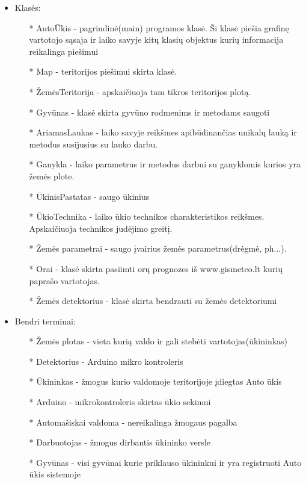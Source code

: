 \documentclass[oneside]{VUMIFPSkursinis}
\begin{document}
\begin{itemize}
	\item Klasės:
		\begin{itemize}
			\item[*] AutoŪkis - pagrindinė(main) programos klasė. Ši klasė piešia grafinę vartotojo sąsaja ir laiko savyje kitų klasių objektus kurių informacija reikalinga piešimui
			\item[*] Map - teritorijos piešimui skirta klasė.
			\item[*] ŽemėsTeritorija - apskaičiuoja tam tikros teritorijos plotą.
 			\item[*] Gyvūnas - klasė skirta gyvūno rodmenims ir metodams saugoti
			\item[*] AriamasLaukas - laiko savyje reikšmes apibūdinančias unikalų lauką ir metodus susijusius su lauko darbu.
			\item[*] Ganykla - laiko parametrus ir metodus darbui su ganyklomis kurios yra žemės plote.
			\item[*] ŪkinisPastatas - saugo ūkinius 
			\item[*] ŪkioTechnika - laiko ūkio technikos charakteristikos reikšmes. Apskaičiuoja technikos judėjimo greitį.
			\item[*]Žemės parametrai - saugo įvairius žemės parametrus(drėgmė, ph...).
			\item[*] Orai - klasė skirta pasiimti orų prognozes iš www.gismeteo.lt kurių paprašo vartotojas.
			\item[*] Žemės detektorius - klasė skirta bendrauti su žemės detektoriumi

		\end{itemize}
	\item Bendri terminai:
		\begin{itemize}
			\item[*] Žemės plotas - vieta kurią valdo ir gali stebėti vartotojas(ūkininkas) 
			\item[*] Detektorius - Arduino mikro kontroleris
			\item[*] Ūkininkas - žmogus kurio valdomoje teritorijoje įdiegtas Auto ūkis
			\item[*] Arduino - mikrokontroleris skirtas ūkio sekimui
			\item[*] Automašiskai valdoma - nereikalinga žmogaus pagalba
			\item[*] Darbuotojas - žmogus dirbantis ūkininko versle
			\item[*] Gyvūnas - visi gyvūnai kurie priklauso ūkininkui ir yra registruoti Auto ūkis sistemoje 
		\end{itemize}
\end{itemize}
\end{document}

